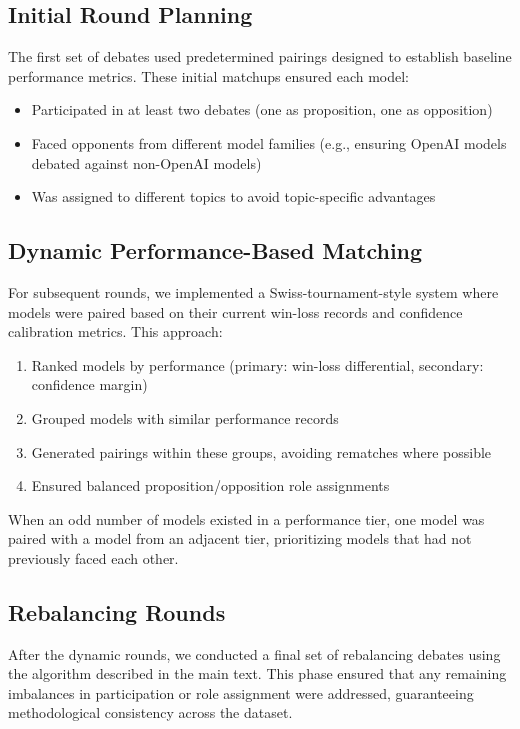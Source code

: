 \documentclass{article}
\begin{document}
\subsection{Initial Round Planning}
The first set of debates used predetermined pairings designed to establish baseline performance metrics. These initial matchups ensured each model:
\begin{itemize}
\item Participated in at least two debates (one as proposition, one as opposition)
\item Faced opponents from different model families (e.g., ensuring OpenAI models debated against non-OpenAI models)
\item Was assigned to different topics to avoid topic-specific advantages
\end{itemize}
\subsection{Dynamic Performance-Based Matching}
For subsequent rounds, we implemented a Swiss-tournament-style system where models were paired based on their current win-loss records and confidence calibration metrics. This approach:
\begin{enumerate}
\item Ranked models by performance (primary: win-loss differential, secondary: confidence margin)
\item Grouped models with similar performance records
\item Generated pairings within these groups, avoiding rematches where possible
\item Ensured balanced proposition/opposition role assignments
\end{enumerate}
When an odd number of models existed in a performance tier, one model was paired with a model from an adjacent tier, prioritizing models that had not previously faced each other.
\subsection{Rebalancing Rounds}
After the dynamic rounds, we conducted a final set of rebalancing debates using the algorithm described in the main text. This phase ensured that any remaining imbalances in participation or role assignment were addressed, guaranteeing methodological consistency across the dataset.
\end{document}
